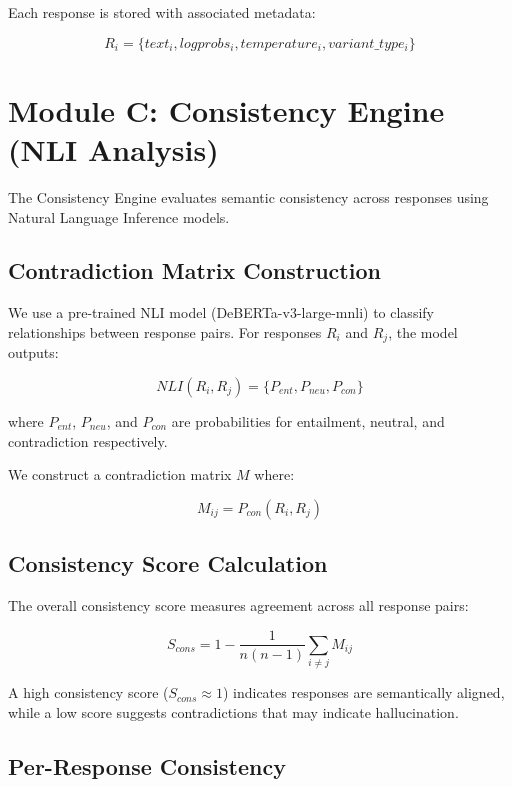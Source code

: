 Each response is stored with associated metadata:

\begin{equation}
    R_i = \{text_i, logprobs_i, temperature_i, variant\_type_i\}
\end{equation}

\section{Module C: Consistency Engine (NLI Analysis)}

The Consistency Engine evaluates semantic consistency across responses using Natural Language Inference models.

\subsection{Contradiction Matrix Construction}

We use a pre-trained NLI model (DeBERTa-v3-large-mnli) to classify relationships between response pairs. For responses $R_i$ and $R_j$, the model outputs:

\begin{equation}
    NLI(R_i, R_j) = \{P_{ent}, P_{neu}, P_{con}\}
\end{equation}

where $P_{ent}$, $P_{neu}$, and $P_{con}$ are probabilities for entailment, neutral, and contradiction respectively.

We construct a contradiction matrix $M$ where:

\begin{equation}
    M_{ij} = P_{con}(R_i, R_j)
\end{equation}

\subsection{Consistency Score Calculation}

The overall consistency score measures agreement across all response pairs:

\begin{equation}
    S_{cons} = 1 - \frac{1}{n(n-1)} \sum_{i \neq j} M_{ij}
\end{equation}

A high consistency score ($S_{cons} \approx 1$) indicates responses are semantically aligned, while a low score suggests contradictions that may indicate hallucination.

\subsection{Per-Response Consistency}

